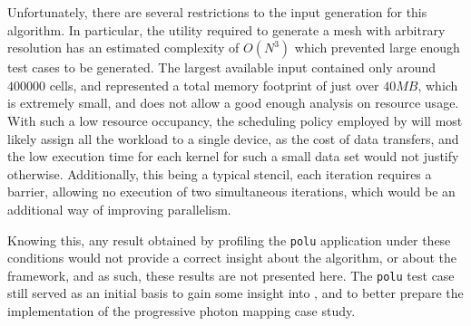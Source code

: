 \documentclass[main.tex]{subfiles}
\begin{document}
Unfortunately, there are several restrictions to the input generation for this algorithm. In particular, the utility required to generate a mesh with arbitrary resolution has an estimated complexity of $O(N^3)$ which prevented large enough test cases to be generated. The largest available input contained only around $400000$ cells, and represented a total memory footprint of just over $40MB$, which is extremely small, and does not allow a good enough analysis on resource usage. With such a low resource occupancy, the scheduling policy employed by \gama will most likely assign all the workload to a single device, as the cost of data transfers, and the low execution time for each kernel for such a small data set would not justify otherwise. Additionally, this being a typical stencil, each iteration requires a barrier, allowing no execution of two simultaneous iterations, which would be an additional way of improving parallelism.

Knowing this, any result obtained by profiling the \texttt{polu} application under these conditions would not provide a correct insight about the algorithm, or about the framework, and as such, these results are not presented here.
The \texttt{polu} test case still served as an initial basis to gain some insight into \gama, and to better prepare the implementation of the progressive photon mapping case study.
\end{document}
